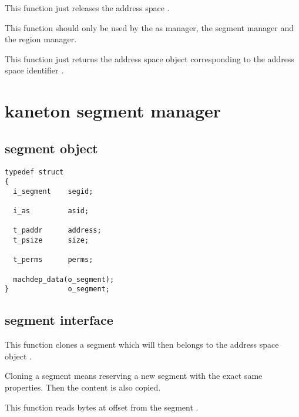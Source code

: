 	 {
	   This function just releases the address space .
	 }

	 {
	   This function should only be used by the as manager, the segment
	   manager and the region manager.

	   This function just returns the address space object
	   corresponding to the address space identifier .
	 }



\section*{kaneton segment manager}

\subsection*{segment object}

\begin{verbatim}
typedef struct
{
  i_segment    segid;

  i_as         asid;

  t_paddr      address;
  t_psize      size;

  t_perms      perms;

  machdep_data(o_segment);
}              o_segment;
\end{verbatim}

\subsection*{segment interface}

	 {
	   This function clones a segment which will then belongs to
	   the address space object .

	   Cloning a segment means reserving a new segment with the
	   exact same properties. Then the content is also copied.
	 }

	 {
	   This function reads  bytes at offset
	    from the segment .
	 }

